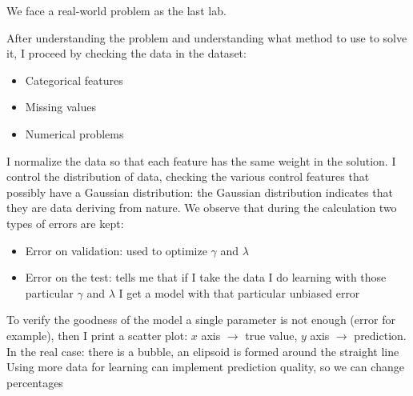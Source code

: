 We face a real-world problem as the last lab.

After understanding the problem and understanding what method to use to solve it, I proceed by checking the data in the dataset:
\begin{itemize}
	
	\item Categorical features
	\item Missing values
	\item Numerical problems
	
\end{itemize}
I normalize the data so that each feature has the same weight in the solution.
I control the distribution of data, checking the various control features that possibly have a Gaussian distribution: the Gaussian distribution indicates that they are data deriving from nature.
We observe that during the calculation two types of errors are kept:
\begin{itemize}
	
	\item Error on validation: used to optimize $\gamma$ and $\lambda$
	\item Error on the test: tells me that if I take the data I do learning with those particular $\gamma$ and $\lambda$ I get a model with that particular unbiased error

	
\end{itemize}
To verify the goodness of the model a single parameter is not enough (error for example), then I print a scatter plot: $x$ axis $\rightarrow$ true value, $y$ axis $\rightarrow$ prediction.
In the real case: there is a bubble, an elipsoid is formed around the straight line
Using more data for learning can implement prediction quality, so we can change percentages


